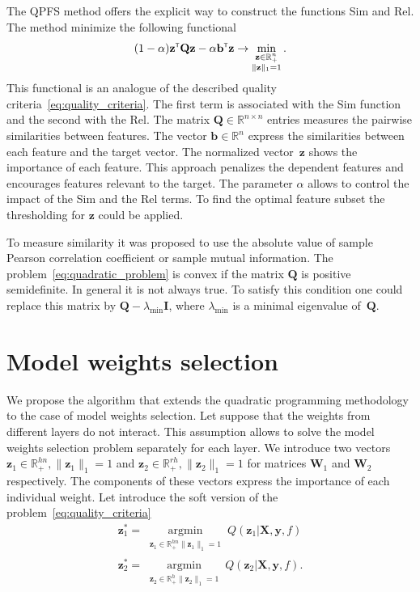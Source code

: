 \documentclass[a4paper,12pt]{article}
\theoremstyle{plain} %
\theoremstyle{definition} %
\theoremstyle{remark} %
\newcommand{\bQ}{\mathbf{Q}}
\newcommand{\bW}{\mathbf{W}}
\newcommand{\by}{\mathbf{y}}
\newcommand{\bz}{\mathbf{z}}
\newcommand{\bX}{\mathbf{X}}
\newcommand{\bbR}{\mathbb{R}}
\newcommand{\T}{{\text{\tiny\sffamily\upshape\mdseries T}}}
\newcommand{\argmin}{\mathop{\arg \min}\limits}
\begin{document}
	The QPFS method offers the explicit way to construct the functions Sim and Rel. 
	The method minimize the following functional
	\begin{equation}
		(1 - \alpha) \bz^{\T} \bQ \bz - \alpha \mathbf{b}^{\T} \bz \rightarrow \min_{\substack{\bz \in \bbR^n_+ \\ \|\bz\|_1 = 1}}.
		\label{eq:quadratic_problem}
	\end{equation}
	This functional is an analogue of the described quality criteria~\ref{eq:quality_criteria}.
  	The first term is associated with the Sim function and the second with the Rel. 
  	The matrix $\bQ \in \bbR^{n \times n}$ entries measures the pairwise similarities between features. 
  	The vector $\mathbf{b} \in \bbR^n$ express the similarities between each feature and the target vector.
  	The normalized vector~$\bz$ shows the importance of each feature. 
  	This approach penalizes the dependent features and encourages features relevant to the target. 
  	The parameter $\alpha$ allows to control the impact of the Sim and the Rel terms.
  	To find the optimal feature subset the thresholding for $\bz$ could be applied.
  	
  	To measure similarity it was proposed to use the absolute value of sample Pearson correlation coefficient or sample mutual information.
  	The problem~\ref{eq:quadratic_problem} is convex if the matrix $\bQ$ is positive semidefinite. In general it is not always true. To satisfy this condition one could replace this matrix by $\bQ - \lambda_{\text{min}} \mathbf{I}$, where $\lambda_{\text{min}} $ is a minimal eigenvalue of~$\bQ$.
  	  	
  	\section*{Model weights selection}
  	
	We propose the algorithm that extends the quadratic programming methodology to the case of model weights selection.
	Let suppose that the weights from different layers do not interact. 
	This assumption allows to solve the model weights selection problem separately for each layer.
	We introduce two vectors $\bz_1 \in \bbR^{hn}_{+}, \|\bz_1\|_1 = 1$ and $\bz_2 \in \bbR^{rh}_{+}, \|\bz_2\|_1 = 1$ for matrices $\bW_1$ and $\bW_2$ respectively. 
	The components of these vectors express the importance of each individual weight.
	Let introduce the soft version of the problem~\ref{eq:quality_criteria}
	\begin{align}
		\bz_1^* = \argmin_{\substack{\bz_1 \in \bbR^{hn}_{+} \| \bz_1 \|_1 = 1}} Q(\bz_1 | \bX, \by, f) 
		\label{eq:soft_quality_criteria1}\\
		\bz_2^* = \argmin_{\substack{ \bz_2 \in \bbR^{h}_{+} \| \bz_2 \|_1 = 1}} Q(\bz_2 | \bX, \by, f) .
		\label{eq:soft_quality_criteria2}
	\end{align}
\end{document}
